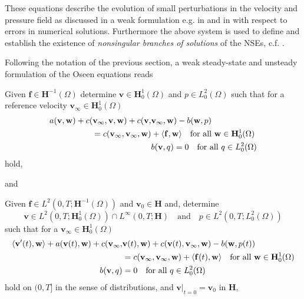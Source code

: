 \documentclass[a4paper,10pt,BCOR=15mm]{scrbook}
\providecommand{\dupa}[2]{\langle #1,#2 \rangle}
\providecommand{\andi}[0]{\quad \text{and} \quad}
\begin{document}
These equations describe the evolution of small perturbations in the velocity and pressure field as discussed in a weak formulation e.g. in \cite{emmhyd} and in \cite{jorabo} with respect to errors in numerical solutions. Furthermore the above system is used to define and establish the existence of \textit{nonsingular branches of solutions} of the NSEs, c.f. \cite[pp. 297]{gira}.

Following the notation of the previous section, a weak steady-state and unsteady formulation of the Oseen equations reads

 \begin{prob}\label{stprose}
 Given $\mathbf f \in \mathbf H ^{-1}(\Omega)$ determine $
 \mathbf v \in \mathbf H ^1_0 (\Omega)$ and $p \in L ^2_0 (\Omega)$ such that for a reference velocity $\mathbf v _\infty \in \mathbf H_0^1(\Omega)$
\begin{subequations}
\begin{align*}
a(\mathbf v, \mathbf w) +  c(\mathbf v_\infty, \mathbf v, \mathbf w)+c(\mathbf v,& \mathbf v_\infty, \mathbf w)-b(\mathbf w, p) \notag \\
=c(\mathbf v_\infty,\mathbf v_\infty, \mathbf w)&+\dupa{\mathbf f}{\mathbf w} \quad \text{for all } \mathbf w \in \mathbf H_0^1(\Omega)  \\
&b(\mathbf v, q) = 0 \quad \text{for all }q \in L_0^2(\Omega)
 \end{align*}
\end{subequations}
hold,
\end{prob}

and

 \begin{prob}\label{prose}
 Given $\mathbf f \in L^2(0,T;\mathbf H ^{-1}(\Omega))$ and $\mathbf v _0 \in \mathbf H$ and, determine 
\begin{equation*}
 \mathbf v \in L^2(0,T;\mathbf H ^1_0 (\Omega)) \cap L^\infty (0,T;\mathbf H) \andi p \in L^2(0,T;L ^2_0 (\Omega))
\end{equation*}
  such that for a $\mathbf v _\infty \in \mathbf H_0^1(\Omega)$
\begin{subequations}
\begin{align*}
 \dupa { \mathbf v'(t)}{ \mathbf w } + a(\mathbf v(t), \mathbf w) + c(\mathbf v_\infty, &\mathbf v(t), \mathbf w)+c(\mathbf v(t),\mathbf v_\infty, \mathbf w)-b(\mathbf w, p(t)) \notag \\
&=c(\mathbf v_\infty,\mathbf v_\infty, \mathbf w)+\dupa{\mathbf f(t)}{\mathbf w} \quad \text{for all } \mathbf w \in \mathbf H_0^1(\Omega)  \\
b(\mathbf v, q) &= 0 \quad \text{for all }q \in L_0^2(\Omega)
 \end{align*}
\end{subequations}
hold on $(0,T]$ in the sense of distributions, and $\mathbf v \vert _{t=0} = \mathbf v_0$ in $\mathbf H$,
\end{prob}
\end{document}
